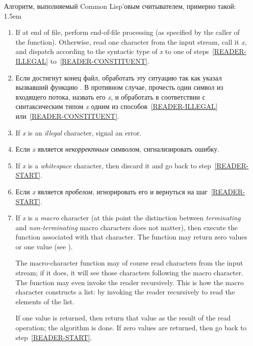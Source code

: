 Алгоритм, выполняемый Common Lisp'овым считывателем, примерно такой:
\begingroup\leftmargini 1.5em
\begin{enumerate}
\item
If at end of file, perform end-of-file processing (as specified
by the caller of the  function).
Otherwise,
read one character from the input stream, call it \emph{x}, and
dispatch according to the syntactic type of \emph{x} to one
of steps~\ref{READER-ILLEGAL} to~\ref{READER-CONSTITUENT}.
\label{READER-START}

\item Если достигнут конец файл, обработать эту ситуацию так как
  указал вызвавший функцию .  В противном случае, прочесть
  один символ из входящего потока, назвать его \emph{x}, и обработать
  в соответствии с синтаксическим типом \emph{x} одним из
  способов~\ref{READER-ILLEGAL} или~\ref{READER-CONSTITUENT}.
\label{READER-START}

\item
If \emph{x} is an \emph{illegal} character, signal an error.
\label{READER-ILLEGAL}

\item Если \emph{x} является \emph{некорректным} символом,
  сигнализировать ошибку.
\label{READER-ILLEGAL}

\item
If \emph{x} is a \emph{whitespace} character,
then discard it and go back to step~\ref{READER-START}.
\label{READER-WHITESPACE}

\item Если \emph{x} является \emph{пробелом}, игнорировать его и
  вернуться на шаг~\ref{READER-START}.
\label{READER-WHITESPACE}

\item
If \emph{x} is a \emph{macro} character (at this point the
distinction between \emph{terminating} and \emph{non-terminating} macro characters
does not matter), then execute the function associated
with that character.  The function may return zero values or one value
(see ).

The macro-character function may of course read characters from the input
stream; if it does, it will see those characters following the macro
character.  The function may even invoke the reader recursively.
This is how the macro character \cd{(} constructs a list:
by invoking the reader recursively to read the elements of the list.

If one value is returned, then return that value as the result of the
read operation; the algorithm is done.
If zero values are returned, then go back to step~\ref{READER-START}.


\end{enumerate}
